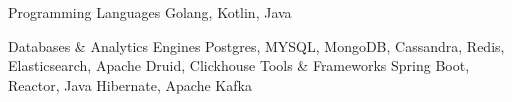 

\begin{cvskills}

  \cvskill
    {Programming Languages} %
    {Golang, Kotlin, Java} %

  \cvskill
    {Databases \& Analytics Engines} %
    {Postgres, MYSQL, MongoDB, Cassandra, Redis, Elasticsearch, Apache Druid, Clickhouse} %
  \cvskill
    {Tools \& Frameworks} %
    {Spring Boot, Reactor, Java Hibernate, Apache Kafka} %

\end{cvskills}
